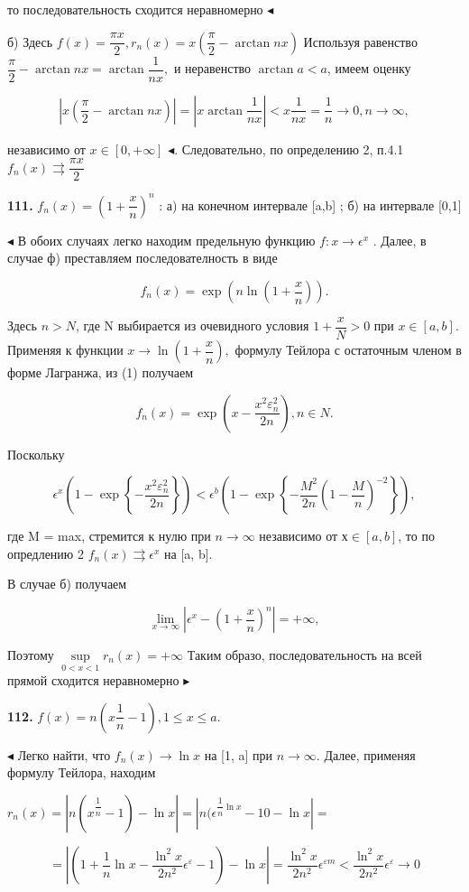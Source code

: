 \documentclass[a4paper, 12pt]{article}
\begin{document}
то последовательность сходится неравномерно $\blacktriangleleft$

б) Здесь $f(x) = \dfrac{\pi x}{2}, r_n(x) = x \left(\dfrac{\pi}{2} - \arctan nx\right)$ Используя равенство $\dfrac{\pi}{2} - \arctan nx = \arctan \dfrac{1}{nx},$ и неравенство $\arctan a < a$, имеем оценку 

\[\left| x \left( \dfrac{\pi}{2} - \arctan nx \right) \right| = \left| x\arctan \dfrac{1}{nx} \right| < x\frac{1}{nx} = \frac{1}{n} \to 0,  n \to \infty,\]

независимо от $x\in[0, +\infty]$ $\blacktriangleleft$. Следовательно, по определению 2, п.4.1 $f_n(x) \rightrightarrows \dfrac{\pi x}{2}$

\textbf{\textbf{111.}} $f_n(x)=\left(1+\dfrac{x}{n}\right)^n$ : а) на конечном интервале [a,b] ; б) на интервале [0,1] 

$\blacktriangleleft$ В обоих случаях легко находим предельную функцию $f : x \to \epsilon^x$ . Далее, в случае ф) преставляем последователность в виде 

\[f_n(x)=\exp\left(n\ln\left(1+\dfrac{x}{n} \right) \right). \]

\begin{spacing}{0.4}
Здесь $n > N$, где N выбирается из очевидного условия $1 + \dfrac{x}{N}>0$ при $x \in [a, b].$ Применяя к функции $x \to \ln \left(1 + \dfrac{x}{n} \right),$ формулу Тейлора с остаточным членом в форме Лагранжа, из (1) получаем

\[f_n(x)=\exp \left(x - \dfrac{x^2 \varepsilon_n^2}{2n} \right), n \in N. \]
\end{spacing}

Поскольку 

\[\epsilon^x \left( 1-\exp \left\lbrace -\dfrac{x^2 \varepsilon_n^2}{2n} \right\rbrace \right) < \epsilon^b \left( 1 - \exp \left\lbrace -\dfrac{M^2}{2n} \left( 1 - \dfrac{M}{n} \right)^{-2} \right\rbrace \right) ,\]

где M = max, стремится к нулю при $n \to \infty$ независимо от $ х \in [a,b]$, то по опредлению 2 $ f_n(x) \rightrightarrows \epsilon^x $ на [a, b].

В случае б) получаем 

\[ \lim\limits_{x\to \infty} \left| \epsilon^x - \left(1+\dfrac{x}{n} \right)^n \right| = +\infty ,\]

Поэтому $\sup\limits_{0<x<1} r_n(x) = +\infty $ Таким образо, последовательность на всей прямой сходится неравномерно $\blacktriangleright$

\textbf{\textbf{112.}} $f(x)= n \left( x {\dfrac{1}{n}} - 1 \right), 1 \leqslant x \leqslant a.$

$ \blacktriangleleft $ Легко найти, что $f_n(x) \to \ln x $ на [1, a] при $n \to \infty$. Далее, применяя формулу Тейлора, находим 

$ r_n(x)= \left| n(x^{\dfrac{1}{n}} -1) - \ln x \right| = \left| n(\epsilon^{\dfrac{1}{n} \ln x} - 10-\ln x \right| =$

\[= \left|\left(1+\dfrac{1}{n}\ln x - \dfrac{\ln^2x}{2n^2} \epsilon^{\varepsilon} - 1 \right) - \ln x \right| = \dfrac{\ln^2x}{2n^2} \epsilon^{\varepsilon m} < \dfrac{\ln^2x}{2n^2} \epsilon^{\varepsilon} \to 0 \]
\end{document}
